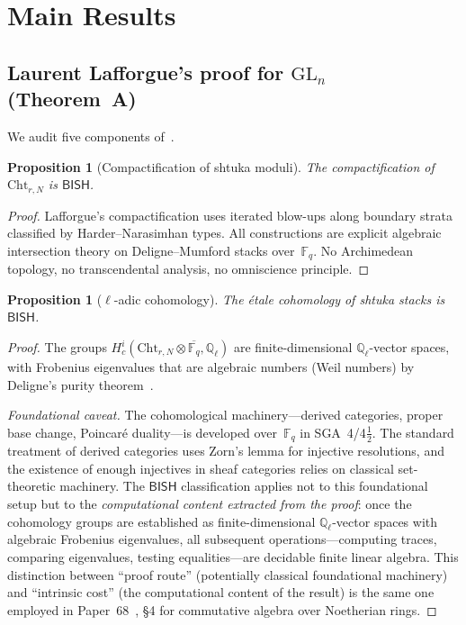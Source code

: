 \documentclass[11pt]{article}
\theoremstyle{plain}
\newtheorem{proposition}[theorem]{Proposition}
\theoremstyle{definition}
\theoremstyle{remark}
\newcommand{\Q}{\mathbb{Q}}
\newcommand{\Fq}{\mathbb{F}_q}
\newcommand{\Qell}{\Q_\ell}
\newcommand{\GL}{\mathrm{GL}}
\newcommand{\Cht}{\mathrm{Cht}}
\newcommand{\BISH}{\mathsf{BISH}}
\begin{document}
\section{Main Results}\label{sec:main}

\subsection{Laurent Lafforgue's proof for $\GL_n$ (Theorem~A)}

We audit five components of~\cite{LLaf02,Rapoport02,Laumon00}.

\begin{proposition}[Compactification of shtuka moduli]\label{prop:compact}
The compactification of $\Cht_{r,N}$ is $\BISH$.
\end{proposition}

\begin{proof}
Lafforgue's compactification uses iterated blow-ups along boundary strata
classified by Harder--Narasimhan types. All constructions are explicit algebraic
intersection theory on Deligne--Mumford stacks over~$\Fq$. No Archimedean
topology, no transcendental analysis, no omniscience principle.
\end{proof}

\begin{proposition}[$\ell$-adic cohomology]\label{prop:etale}
The \'etale cohomology of shtuka stacks is $\BISH$.
\end{proposition}

\begin{proof}
The groups $H^i_c(\Cht_{r,N} \otimes \overline{\Fq}, \Qell)$ are
finite-dimensional $\Qell$-vector spaces, with Frobenius eigenvalues that are
algebraic numbers (Weil numbers) by Deligne's purity theorem~\cite{Deligne80}.

\emph{Foundational caveat.} The cohomological machinery---derived categories,
proper base change, Poincar\'e duality---is developed over~$\Fq$ in
SGA~4/4$\tfrac{1}{2}$. The standard treatment of derived categories uses Zorn's
lemma for injective resolutions, and the existence of enough injectives in
sheaf categories relies on classical set-theoretic machinery. The $\BISH$
classification applies not to this foundational setup but to the
\emph{computational content extracted from the proof}: once the cohomology
groups are established as finite-dimensional $\Qell$-vector spaces with
algebraic Frobenius eigenvalues, all subsequent operations---computing traces,
comparing eigenvalues, testing equalities---are decidable finite linear algebra.
This distinction between ``proof route'' (potentially classical foundational
machinery) and ``intrinsic cost'' (the computational content of the result) is
the same one employed in Paper~68~\cite{Paper68}, \S4 for commutative algebra
over Noetherian rings.
\end{proof}
\end{document}
